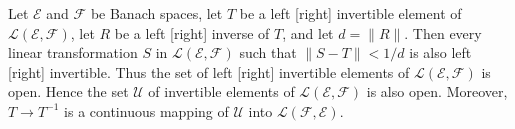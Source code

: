Let $\mathcal{E}$ and $\mathcal{F}$ be Banach spaces, let $T$ be a left [right] invertible element of $\mathcal{L}(\mathcal{E}, \mathcal{F})$, let $R$ be a left [right] inverse of $T$, and let $d = \| R \|$. Then every linear transformation $S$ in $\mathcal{L}(\mathcal{E}, \mathcal{F})$ such that $\| S - T \| < 1/d$ is also left [right] invertible. Thus the set of left [right] invertible elements of $\mathcal{L}(\mathcal{E}, \mathcal{F})$ is open. Hence the set $\mathcal{U}$ of invertible elements of $\mathcal{L}(\mathcal{E}, \mathcal{F})$ is also open. Moreover, $T \rightarrow T^{-1}$ is a continuous mapping of $\mathcal{U}$ into $\mathcal{L}(\mathcal{F}, \mathcal{E})$.
